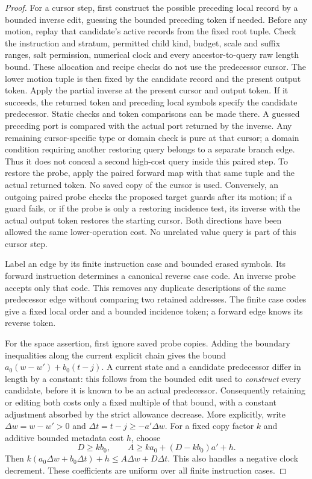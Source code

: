 \begin{proof}
For a cursor step, first construct the possible preceding local record
by a bounded inverse edit, guessing the bounded preceding token if
needed.  Before any motion, replay that candidate's active records from
the fixed root tuple.  Check the instruction and stratum, permitted
child kind, budget, scale and suffix ranges, salt permission, numerical
clock and every ancestor-to-query raw length bound.  These allocation
and recipe checks do not use the predecessor cursor.  The lower motion
tuple is then fixed by the candidate record and the present output
token.  Apply the partial inverse at the present cursor
and output token.  If it succeeds, the returned token and preceding
local symbols specify the candidate predecessor.  Static checks and
token comparisons can be made there.
A guessed preceding port is compared with the actual port returned by
the inverse.  Any remaining cursor-specific type or domain check is
pure at that cursor; a domain condition requiring another restoring
query belongs to a separate branch edge.  Thus it does not conceal a
second high-cost query inside this paired step.
To restore the probe, apply the
paired forward map with that same tuple and the actual returned token.
No saved copy of the cursor is used.  Conversely, an outgoing paired
probe checks the proposed target guards after its motion; if a guard
fails, or if the probe is only a restoring incidence test, its inverse
with the actual output token restores the starting cursor.  Both
directions have been allowed
the same lower-operation cost.  No unrelated value query is part of
this cursor step.

Label an edge by its finite instruction case and bounded erased
symbols.  Its forward instruction determines a canonical reverse case
code.  An inverse probe accepts only that code.  This removes any
duplicate descriptions of the same predecessor edge without comparing
two retained addresses.  The finite case codes give a fixed local order
and a bounded incidence token; a forward edge knows its reverse token.

For the space assertion, first ignore saved probe copies.  Adding the
boundary inequalities along the current explicit chain gives the bound
$a_0(w-w')+b_0(t-j)$.  A current state and a candidate predecessor differ in
length by a constant: this follows from the bounded edit used to
\emph{construct} every candidate, before it is known to be an actual
predecessor.  Consequently retaining or editing both costs only a fixed
multiple of that bound, with a constant adjustment absorbed by the
strict allowance decrease.  More explicitly, write
$\Delta w=w-w'>0$ and $\Delta t=t-j\ge-a'\Delta w$.  For a fixed copy
factor $k$ and additive bounded metadata cost $h$, choose
\begin{equation}\label{eq:ctrl-copy-coefficients}
 D\ge kb_0,\qquad A\ge ka_0+(D-kb_0)a'+h.
\end{equation}
Then $k(a_0\Delta w+b_0\Delta t)+h\le A\Delta w+D\Delta t$.
This also handles a negative clock decrement.  These coefficients are
uniform over all finite instruction cases.


\end{proof}
